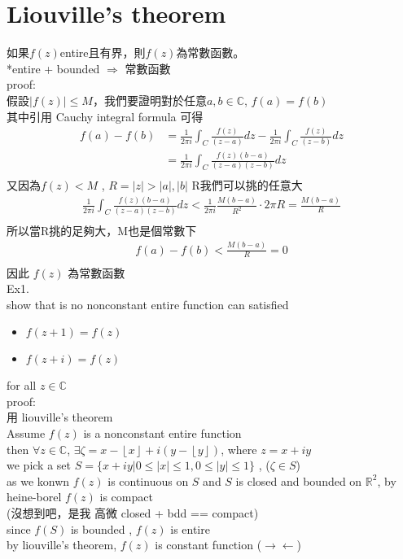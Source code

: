 \documentclass{article}
\begin{document}
\section{Liouville's theorem}
如果$f(z)$entire且有界，則$f(z)$為常數函數。\\
*entire + bounded $\Rightarrow$ 常數函數\\
proof:\\
假設$|f(z)| \leq M$，我們要證明對於任意$a,b \in \mathbb{C}$, $f(a) = f(b)$\\
其中引用 Cauchy integral formula 可得\\
\begin{align*}
    f(a)-f(b)&= \frac{1}{2\pi i} \int_{C} \frac{f(z)}{(z-a)} dz - \frac{1}{2\pi i} \int_{C} \frac{f(z)}{(z-b)} dz\\
    &= \frac{1}{2\pi i} \int_{C}\frac{f(z)(b-a)}{(z-a)(z-b)} dz \\
\end{align*}
又因為$f(z)<M$ , $R=|z|>|a|,|b|$ R我們可以挑的任意大\\
\begin{align*}
    \frac{1}{2\pi i} \int_{C}\frac{f(z)(b-a)}{(z-a)(z-b)} dz < \frac{1}{2\pi i} \frac{M(b-a)}{R^{2}} \cdot 2\pi R = \frac{ M(b-a)}{R} \\
\end{align*}
所以當R挑的足夠大，M也是個常數下\\
\begin{align*}
    f(a)-f(b) < \frac{M(b-a)}{R} = 0 \\
\end{align*}
因此 $f(z)$ 為常數函數\\

Ex1.\\
show that is no nonconstant entire function can satisfied 
\begin{itemize}
    \item $f(z+1) = f(z)$
    \item $f(z+i) = f(z)$
\end{itemize}
for all $z \in \mathbb{C}$\\
proof:\\
用 liouville's theorem\\
Assume $f(z)$ is a  nonconstant entire function\\
then $\forall z \in \mathbb{C}$, $\exists \zeta = x - \left\lfloor x \right\rfloor + i\left( y - \left\lfloor y \right\rfloor \right)$, where $z = x + iy$\\

we pick a set $S = \{x+iy | 0 \leq |x| \leq 1, 0 \leq |y| \leq 1\}$ , ($\zeta \in S$)\\
as we konwn $f(z)$ is continuous on $S$ and $S$ is closed and bounded on $\mathbb{R}^2$, by heine-borel $f(z)$ is compact \\
(沒想到吧，是我 高微 closed + bdd == compact)\\
since $f(S)$ is bounded , $f(z)$ is entire\\
by liouville's theorem, $f(z)$ is constant function ($\rightarrow \leftarrow $)\\
\end{document}
